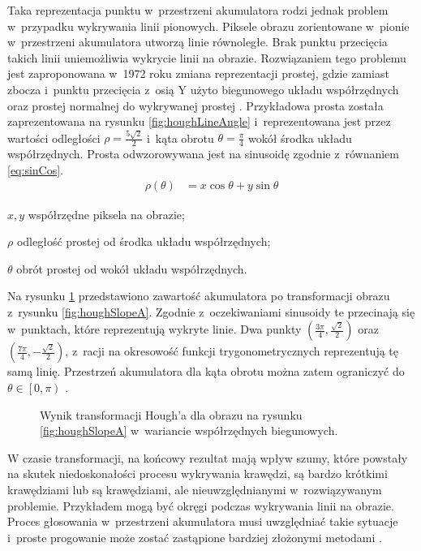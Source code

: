 Taka reprezentacja punktu w~przestrzeni akumulatora rodzi jednak problem w~przypadku wykrywania linii pionowych. Piksele obrazu zorientowane w~pionie w~przestrzeni akumulatora utworzą linie równoległe. Brak punktu przecięcia takich linii uniemożliwia wykrycie linii na obrazie. Rozwiązaniem tego problemu jest zaproponowana w~1972 roku zmiana reprezentacji prostej, gdzie zamiast zbocza i~punktu przecięcia z~osią Y użyto biegunowego układu współrzędnych oraz prostej normalnej do wykrywanej prostej \cite{duda1972use}. Przykładowa prosta została zaprezentowana na rysunku \ref{fig:houghLineAngle} i~reprezentowana jest przez wartości odległości $\rho=\frac{5\sqrt{2}}{2}$ i~kąta obrotu $\theta=\frac{\pi}{4}$ wokół środka układu współrzędnych. Prosta odwzorowywana jest na sinusoidę zgodnie z~równaniem \ref{eq:sinCos}.
\begin{align}
    \rho(\theta) &= x\cos{\theta} + y\sin{\theta} \label{eq:sinCos}
\end{align}
\begin{eqexpl}
    \item{$x, y$} współrzędne piksela na obrazie;
    \item{$\rho$} odległość prostej od środka układu współrzędnych;
    \item{$\theta$} obrót prostej od wokół układu współrzędnych.
\end{eqexpl}

Na rysunku \ref{fig:houghSinCos} przedstawiono zawartość akumulatora po transformacji obrazu z~rysunku \ref{fig:houghSlopeA}. Zgodnie z~oczekiwaniami sinusoidy te przecinają się w~punktach, które reprezentują wykryte linie. Dwa punkty $(\frac{3\pi}{4}, \frac{\sqrt{2}}{2})$ oraz $(\frac{7\pi}{4}, -\frac{\sqrt{2}}{2})$, z~racji na okresowość funkcji trygonometrycznych reprezentują tę samą linię. Przestrzeń akumulatora dla kąta obrotu można zatem ograniczyć do $\theta \in \left[ 0, \pi\right)$ \cite{immerkaer1998some}.

\begin{figure}[t]
    \centering
    
    \caption{Wynik transformacji Hough'a dla obrazu na rysunku \ref{fig:houghSlopeA} w~wariancie współrzędnych biegunowych.}
    \label{fig:houghSinCos}
\end{figure}


W czasie transformacji, na końcowy rezultat mają wpływ szumy, które powstały na skutek niedoskonałości procesu wykrywania krawędzi, są bardzo krótkimi krawędziami lub są krawędziami, ale nieuwzględnianymi w~rozwiązywanym problemie. Przykładem mogą być okręgi podczas wykrywania linii na obrazie. Proces głosowania w~przestrzeni akumulatora musi uwzględniać takie sytuacje i~proste progowanie może zostać zastąpione bardziej złożonymi metodami \cite{palmer1997optimizing, perantonis1998robust}.

